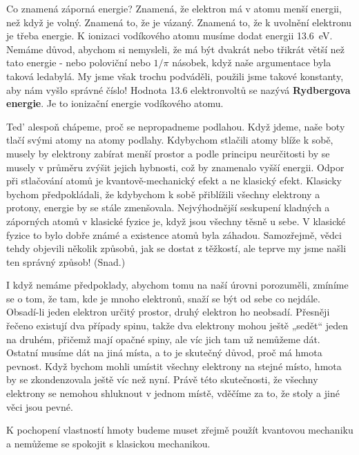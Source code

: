     Co znamená záporná energie? Znamená, že elektron má v atomu menší energii, než když je volný.
    Znamená to, že je vázaný. Znamená to, že k uvolnění elektronu je třeba energie. K ionizaci
    vodíkového atomu musíme dodat energii \SI{13.6}{\eV}. Nemáme důvod, abychom si nemysleli, že má
    být dvakrát nebo třikrát větší než tato energie - nebo poloviční nebo \(1/\pi\) násobek, když
    naše argumentace byla taková ledabylá. My jsme však trochu podváděli, použili jsme takové
    konstanty, aby nám vyšlo správné číslo! Hodnota \num{13.6} elektronvoltů se nazývá
    \textbf{Rydbergova energie}. Je to ionizační energie vodíkového atomu. 
    
    Ted' alespoň chápeme, proč se nepropadneme podlahou. Když jdeme, naše boty tlačí svými atomy na
    atomy podlahy. Kdybychom stlačili atomy blíže k sobě, musely by elektrony zabírat menší prostor
    a podle principu neurčitosti by se musely v průměru zvýšit jejich hybnosti, což by znamenalo
    vyšší energii. Odpor při stlačování atomů je kvantově-mechanický efekt a ne klasický efekt.
    Klasicky bychom předpokládali, že kdybychom k sobě přiblížili všechny elektrony a protony,
    energie by se stále zmenšovala. Nejvýhodnější seskupení kladných a záporných atomů v klasické
    fyzice je, když jsou všechny těsně u sebe. V klasické fyzice to bylo dobře známé a existence
    atomů byla záhadou. Samozřejmě, vědci tehdy objevili několik způsobů, jak se dostat z těžkostí,
    ale teprve my jsme našli ten správný způsob! (Snad.) 
    
    I když nemáme předpoklady, abychom tomu na naší úrovni porozuměli, zmíníme se o tom, že tam, kde
    je mnoho elektronů, snaží se být od sebe co nejdále. Obsadí-li jeden elektron určitý prostor,
    druhý elektron ho neobsadí. Přesněji řečeno existují dva případy spinu, takže dva elektrony
    mohou ještě „sedět“ jeden na druhém, přičemž mají opačné spiny, ale víc jich tam už nemůžeme
    dát. Ostatní musíme dát na jiná místa, a to je skutečný důvod, proč má hmota pevnost. Když
    bychom mohli umístit všechny elektrony na stejné místo, hmota by se zkondenzovala ještě víc než
    nyní. Právě této skutečnosti, že všechny elektrony se nemohou shluknout v jednom místě, vděčíme
    za to, že stoly a jiné věci jsou pevné. 
    
    K pochopení vlastností hmoty budeme muset zřejmě použít kvantovou mechaniku a nemůžeme se
    spokojit s klasickou mechanikou.
  
